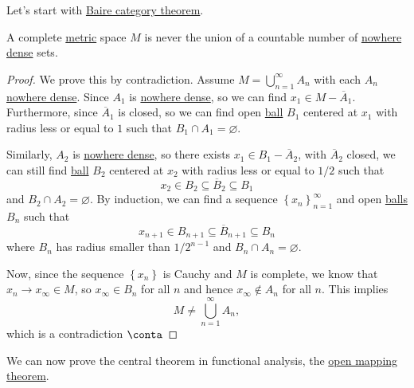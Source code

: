 Let's start with \hyperref[prop:Baire-category]{Baire category theorem}.

\begin{proposition}\label{prop:Baire-category}
	A complete \hyperref[prev:metric]{metric} space \(M\) is never the union of a countable number of \hyperref[def:nowhere-dense]{nowhere dense} sets.
\end{proposition}
\begin{proof}
	We prove this by contradiction. Assume \(M = \bigcup_{n=1}^{\infty} A_n\) with each \(A_n\) \hyperref[def:nowhere-dense]{nowhere dense}. Since \(A_1\) is \hyperref[def:nowhere-dense]{nowhere dense}, so we can find \(x_1\in M- \overline{A} _1\). Furthermore, since \(\overline{A} _1\) is closed, so we can find open \hyperref[def:ball]{ball} \(B_1\) centered at \(x_1\) with radius less or equal to \(1\) such that \(B_1 \cap A_1= \varnothing \).

	Similarly, \(A_2\) is \hyperref[def:nowhere-dense]{nowhere dense}, so there exists \(x_1\in B_1 - \overline{A} _2\), with \(\overline{A} _2\) closed, we can still find \hyperref[def:ball]{ball} \(B_2\) centered at \(x_2\) with radius less or equal to \(1 / 2\) such that
	\[
		x_2 \in B_2 \subseteq \overline{B} _2 \subseteq B_1
	\]
	and \(B_2 \cap A_2 = \varnothing \). By induction, we can find a sequence \(\left\{ x_n \right\} _{n=1}^{\infty} \) and open \hyperref[def:ball]{balls} \(B_n\) such that
	\[
		x_{n+1} \in B_{n+1} \subseteq \overline{B} _{n+1} \subseteq B_n
	\]
	where \(B_n\) has radius smaller than \(1 / 2^{n-1}\) and \(B_n \cap A_n = \varnothing \).

	Now, since the sequence \(\left\{ x_ n \right\} \) is Cauchy and \(M\) is complete, we know that \(x_n \to x_{\infty }\in M\), so \(x_{\infty }\in B_n\) for all \(n\) and hence \(x_\infty \notin A_n\) for all \(n\). This implies
	\[
		M \neq \bigcup\limits_{n=1}^{\infty} A_n,
	\]
	which is a contradiction \(\conta\)
\end{proof}

We can now prove the central theorem in functional analysis, the \hyperref[thm:open-mapping]{open mapping theorem}.

